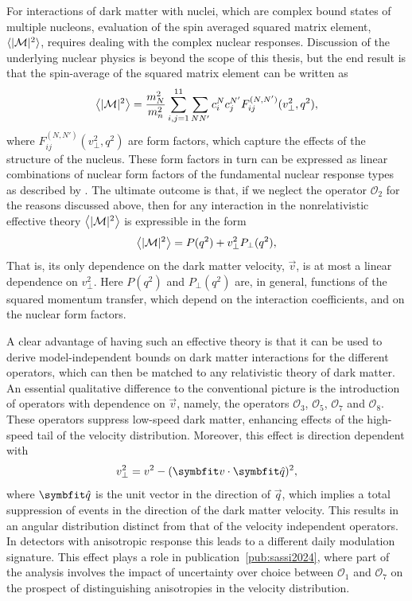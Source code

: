 For interactions of dark matter with nuclei, which are complex bound states of multiple nucleons, evaluation of the spin averaged squared matrix element, $\langle|\mathcal{M}|^2\rangle$, requires dealing with the complex nuclear responses. Discussion of the underlying nuclear physics is beyond the scope of this thesis, but the end result is that the spin-average of the squared matrix element can be written as
\begin{equation}
    \left\langle|\mathcal{M}|^2\right\rangle=\frac{m_N^2}{m_n^2}\sum_{i,j=1}^{11}\sum_{NN'}c_i^Nc_j^{N'}F_{ij}^{(N,N')}(v_\perp^2,q^2),
\end{equation}
where $F_{ij}^{(N,N')}(v_\perp^2,q^2)$ are form factors, which capture the effects of the structure of the nucleus. These form factors in turn can be expressed as linear combinations of nuclear form factors of the fundamental nuclear response types as described by \textcite{FitzpatrickEtAl2013}. The ultimate outcome is that, if we neglect the operator $\mathcal{O}_2$ for the reasons discussed above, then for any interaction in the nonrelativistic effective theory $\left\langle|\mathcal{M}|^2\right\rangle$ is expressible in the form
\begin{equation}
    \left\langle|\mathcal{M}|^2\right\rangle=P(q^2)+v_\perp^2P_\perp(q^2),
    \label{eq:eft-amplitude-square}
\end{equation}
That is, its only dependence on the dark matter velocity, $\vec{v}$, is at most a linear dependence on $v_\perp^2$. Here $P(q^2)$ and $P_\perp(q^2)$ are, in general, functions of the squared momentum transfer, which depend on the interaction coefficients, and on the nuclear form factors.

A clear advantage of having such an effective theory is that it can be used to derive model-independent bounds on dark matter interactions for the different operators, which can then be matched to any relativistic theory of dark matter. An essential qualitative difference to the conventional picture is the introduction of operators with dependence on $\vec{v}$, namely, the operators $\mathcal{O}_3$, $\mathcal{O}_5$, $\mathcal{O}_7$ and $\mathcal{O}_8$. These operators suppress low-speed dark matter, enhancing effects of the high-speed tail of the velocity distribution. Moreover, this effect is direction dependent with
\begin{equation}
v_\perp^2=v^2-(\vec{v}\cdot\unitv{q})^2,
\end{equation}
where $\unitv{q}$ is the unit vector in the direction of $\vec{q}$, which implies a total suppression of events in the direction of the dark matter velocity. This results in an angular distribution distinct from that of the velocity independent operators. In detectors with anisotropic response this leads to a different daily modulation signature. This effect plays a role in publication~\ref{pub:sassi2024}, where part of the analysis involves the impact of uncertainty over choice between $\mathcal{O}_1$ and $\mathcal{O}_7$ on the prospect of distinguishing anisotropies in the velocity distribution.

